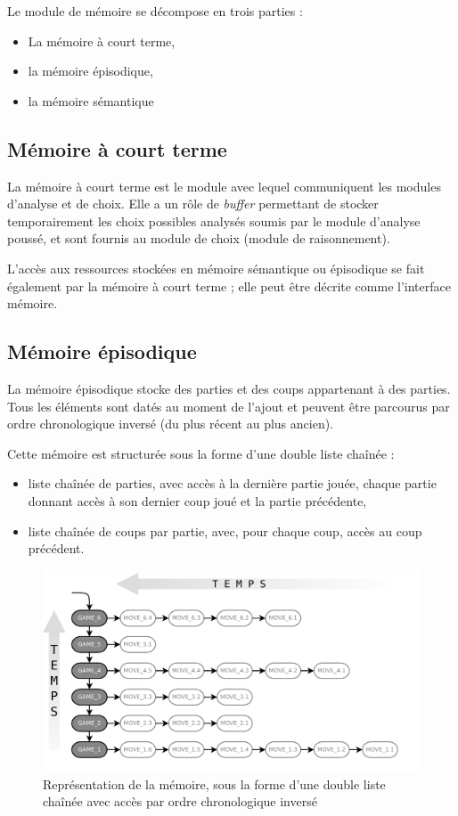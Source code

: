 Le module de mémoire se décompose en trois parties :
\begin{itemize}
\item La mémoire à court terme,
\item la mémoire épisodique,
\item la mémoire sémantique
\end{itemize}

\subsection{Mémoire à court terme}

La mémoire à court terme est le module avec lequel communiquent les modules d'analyse et de choix. Elle a un rôle de \emph{buffer} permettant de stocker temporairement les choix possibles analysés soumis par le module d'analyse poussé, et sont fournis au module de choix (module de raisonnement).

L'accès aux ressources stockées en mémoire sémantique ou épisodique se fait également par la mémoire à court terme ; elle peut être décrite comme l'interface mémoire.

\subsection{Mémoire épisodique}
\label{conception_memoire_episodique}

La mémoire épisodique stocke des parties et des coups appartenant à des parties. Tous les éléments sont datés au moment de l'ajout et peuvent être parcourus par ordre chronologique inversé (du plus récent au plus ancien).

Cette mémoire est structurée sous la forme d'une double liste chaînée :
\begin{itemize}
\item liste chaînée de parties, avec accès à la dernière partie jouée, chaque partie donnant accès à son dernier coup joué et la partie précédente,
\item liste chaînée de coups par partie, avec, pour chaque coup, accès au coup précédent.
\end{itemize}

\begin{figure}[H]
\includegraphics[width=\textwidth]{files/memoire/episodic_general}
\caption{Représentation de la mémoire, sous la forme d'une double liste chaînée avec accès par ordre chronologique inversé}
\end{figure}

